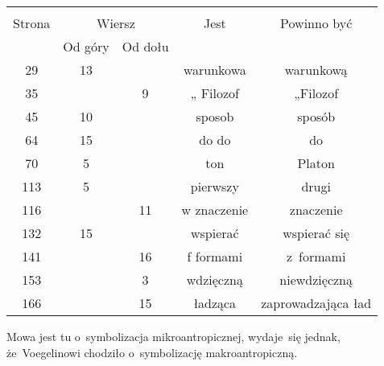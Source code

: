 \documentclass[a4paper,11pt]{article}
\begin{document}

\begin{center}

  \begin{tabular}{|c|c|c|c|c|}
    \hline
    & \multicolumn{2}{c|}{} & & \\
    Strona & \multicolumn{2}{c|}{Wiersz} & Jest
                              & Powinno być \\ \cline{2-3}
    & Od góry & Od dołu & & \\
    \hline
    29  & 13 & & warunkowa & warunkową \\
    35  & &  9 & „ Filozof & „Filozof \\
    45  & 10 & & sposob & sposób \\
    64  & 15 & & do do & do \\
    70  &  5 & & ton & Platon \\
    113 &  5 & & pierwszy & drugi \\
    116 & & 11 & w znaczenie & znaczenie \\
    132 & 15 & & wspierać & wspierać się \\
    141 & & 16 & f formami & z~formami \\
    153 & &  3 & wdzięczną & niewdzięczną \\
    166 & & 15 & ładząca & zaprowadzająca ład \\
    \hline
  \end{tabular}

\end{center}


\vspace{\spaceTwo}













\noi {}

\vspace{\spaceFour}

\start {} Mowa jest tu o~symbolizacja mikroantropicznej,
wydaje~się jednak, że~Voegelinowi chodziło o~symbolizację
makroantropiczną.
\end{document}
